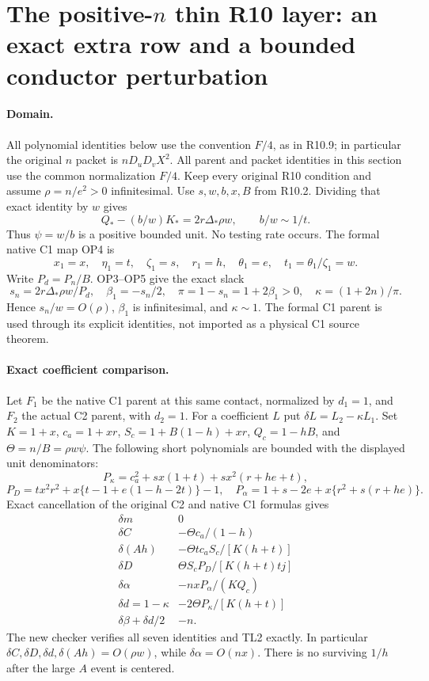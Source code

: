 \section{The positive-$n$ thin R10 layer: an exact extra row and a bounded conductor perturbation}

\paragraph{Domain.}
All polynomial identities below use the convention $F/4$, as in
R10.9; in particular the original $n$ packet is $nD_uD_vX^2$.
All parent and packet identities in this section use the common normalization $F/4$.
Keep every original R10 condition and assume
$\rho=n/e^2>0$ infinitesimal. Use $s,w,b,x,B$ from R10.2.
Dividing that exact identity by $w$ gives
\[
 Q_*-(b/w)K_*=2r\Delta_*\rho w,
 \qquad b/w\sim1/t.
\tag{TL1}
\]
Thus $\psi=w/b$ is a positive bounded unit. No testing rate occurs.
The formal native C1 map OP4 is
\[
 x_1=x,\quad\eta_1=t,\quad\zeta_1=s,\quad r_1=h,\quad
 \theta_1=e,\quad t_1=\theta_1/\zeta_1=w.
\]
Write $P_d=P_n/B$. OP3--OP5 give the exact slack
\[
 s_n=2r\Delta_*\rho w/P_d,\quad
 \beta_1=-s_n/2,\quad \pi=1-s_n=1+2\beta_1>0,\quad
 \kappa=(1+2n)/\pi.
\tag{TL2}
\]
Hence $s_n/w=O(\rho)$, $\beta_1$ is infinitesimal, and
$\kappa\sim1$. The formal C1 parent is used through its explicit
identities, not imported as a physical C1 source theorem.

\paragraph{Exact coefficient comparison.}
Let $F_1$ be the native C1 parent at this same contact, normalized by
$d_1=1$, and $F_2$ the actual C2 parent, with $d_2=1$.
For a coefficient $L$ put $\delta L=L_2-\kappa L_1$.
Set $K=1+x$, $c_a=1+xr$, $S_c=1+B(1-h)+xr$, $Q_c=1-hB$,
and $\Theta=n/B=\rho w\psi$. The following short polynomials are
bounded with the displayed unit denominators:
\[
 P_\kappa=c_a^2+sx(1+t)+sx^2(r+he+t),
\]
\[
 P_D=tx^2r^2+x\{t-1+e(1-h-2t)\}-1,\quad
 P_\alpha=1+s-2e+x\{r^2+s(r+he)\}.
\]
Exact cancellation of the original C2 and native C1 formulas gives
\[
\begin{array}{c|l}
 \delta m&0\\
 \delta C&-\Theta c_a/(1-h)\\
 \delta(Ah)&-\Theta t c_aS_c/[K(h+t)]\\
 \delta D&\Theta S_cP_D/[K(h+t)tj]\\
 \delta\alpha&-nxP_\alpha/(KQ_c)\\
 \delta d=1-\kappa&-2\Theta P_\kappa/[K(h+t)]\\
 \delta\beta+\delta d/2&-n.
\end{array}
\tag{TL3}
\]
The new checker verifies all seven identities and TL2 exactly.
In particular $\delta C,\delta D,\delta d,\delta(Ah)=O(\rho w)$,
while $\delta\alpha=O(nx)$. There is no surviving $1/h$ after the
large $A$ event is centered.

